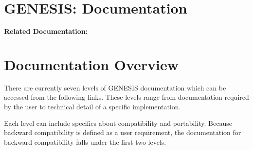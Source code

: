 \documentclass[12pt]{article}
\begin{document}
\section*{GENESIS: Documentation}

{\bf Related Documentation:}

\section*{Documentation Overview}

There are currently seven levels of GENESIS documentation which can be
accessed from the following links.  These levels range from
documentation required by the user to technical detail of a specific
implementation.

Each level can include specifics about compatibility and portability.
Because backward compatibility is defined as a user requirement, the
documentation for backward compatibility falls under the first two
levels.
\end{document}
